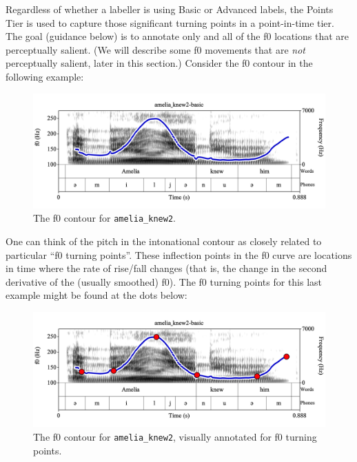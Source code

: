 \documentclass[11pt, twoside]{memoir}
\begin{document}
Regardless of whether a labeller is using Basic or Advanced labels, the Points Tier is used to capture those significant turning points in a point-in-time tier. The goal (guidance below) is to annotate only and all of the f0 locations that are perceptually salient. (We will describe some f0 movements that are \emph{not} perceptually salient, later in this section.) Consider the f0 contour in the following example:

\begin{figure}[H]
\centering
%
\includegraphics[width=.875\linewidth]{Points-amelia_knew2-f0.png}
%
\caption{The f0 contour for \texttt{amelia\_knew2}.%
\label{fig:amelia_knew2 f0 contour}%
}
\end{figure}

One can think of the pitch in the intonational contour as closely related to particular “f0 turning points”. These inflection points in the f0 curve are locations in time where the rate of rise\slash fall changes (that is, the change in the second derivative of the (usually smoothed) f0). The f0 turning points for this last example might be found at the dots below:

\begin{figure}[H]
\centering
%
\includegraphics[width=.875\linewidth]{Points-amelia_knew2-f0-dots.png}
%
\caption{The f0 contour for \texttt{amelia\_knew2}, visually annotated for f0 turning points.%
\label{fig:amelia_knew2 f0 contour turning points}%
}
\end{figure}
\end{document}
